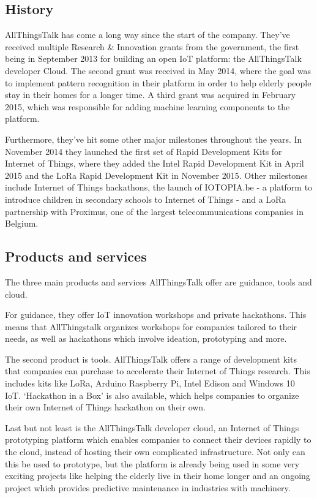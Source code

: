\documentclass[pdftex,a4paper,12pt,twoside]{report}
\begin{document}
\subsection{History}
\label{subsec:atthistory}
AllThingsTalk has come a long way since the start of the company. They've received multiple Research \& Innovation grants from the government, the first being in September 2013 for building an open IoT platform: the AllThingsTalk developer Cloud. The second grant was received in May 2014, where the goal was to implement pattern recognition in their platform in order to help elderly people stay in their homes for a longer time. A third grant was acquired in February 2015, which was responsible for adding machine learning components to the platform.

Furthermore, they've hit some other major milestones throughout the years. In November 2014 they launched the first set of Rapid Development Kits for Internet of Things, where they added the Intel Rapid Development Kit in April 2015 and the LoRa Rapid Development Kit in November 2015. Other milestones include Internet of Things hackathons, the launch of IOTOPIA.be - a platform to introduce children in secondary schools to Internet of Things - and a LoRa partnership with Proximus, one of the largest telecommunications companies in Belgium.

\subsection{Products and services}
\label{subsec:attproductsservices}
The three main products and services AllThingsTalk offer are guidance, tools and cloud. 

For guidance, they offer IoT innovation workshops and private hackathons. This means that AllThingstalk organizes workshops for companies tailored to their needs, as well as hackathons which involve ideation, prototyping and more.

The second product is tools. AllThingsTalk offers a range of development kits that companies can purchase to accelerate their Internet of Things research. This includes kits like LoRa, Arduino Raspberry Pi, Intel Edison and Windows 10 IoT. `Hackathon in a Box' is also available, which helps companies to organize their own Internet of Things hackathon on their own.

Last but not least is the AllThingsTalk developer cloud, an Internet of Things prototyping platform which enables companies to connect their devices rapidly to the cloud, instead of hosting their own complicated infrastructure. Not only can this be used to prototype, but the platform is already being used in some very exciting projects like helping the elderly live in their home longer and an ongoing project which provides predictive maintenance in industries with machinery.
\end{document}
